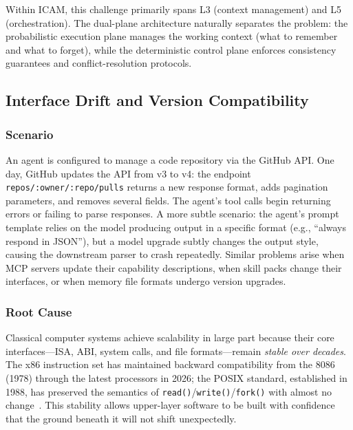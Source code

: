 \documentclass[11pt,a4paper]{article}
\begin{document}
Within ICAM, this challenge primarily spans L3 (context management) and L5 (orchestration).
The dual-plane architecture naturally separates the problem: the probabilistic execution plane manages the working context (what to remember and what to forget), while the deterministic control plane enforces consistency guarantees and conflict-resolution protocols.


\subsection{Interface Drift and Version Compatibility}

\subsubsection{Scenario}
An agent is configured to manage a code repository via the GitHub API.
One day, GitHub updates the API from v3 to v4: the endpoint \texttt{repos/:owner/:repo/pulls} returns a new response format, adds pagination parameters, and removes several fields.
The agent's tool calls begin returning errors or failing to parse responses.
A more subtle scenario: the agent's prompt template relies on the model producing output in a specific format (e.g., ``always respond in JSON''), but a model upgrade subtly changes the output style, causing the downstream parser to crash repeatedly.
Similar problems arise when MCP servers update their capability descriptions, when skill packs change their interfaces, or when memory file formats undergo version upgrades.

\subsubsection{Root Cause}
Classical computer systems achieve scalability in large part because their core interfaces---ISA, ABI, system calls, and file formats---remain \emph{stable over decades}.
The x86 instruction set has maintained backward compatibility from the 8086 (1978) through the latest processors in 2026; the POSIX standard, established in 1988, has preserved the semantics of \texttt{read()}/\texttt{write()}/\texttt{fork()} with almost no change~\cite{ostep_2023}.
This stability allows upper-layer software to be built with confidence that the ground beneath it will not shift unexpectedly.
\end{document}
